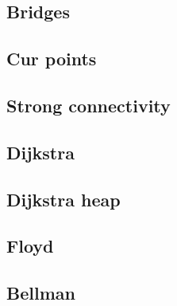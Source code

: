 \documentclass[12pt,a4paper]{article}
\begin{document}


\subsection{Bridges}



\subsection{Cur points}



\subsection{Strong connectivity}



\subsection{Dijkstra}



\subsection{Dijkstra heap}



\subsection{Floyd}



\subsection{Bellman}
\end{document}
